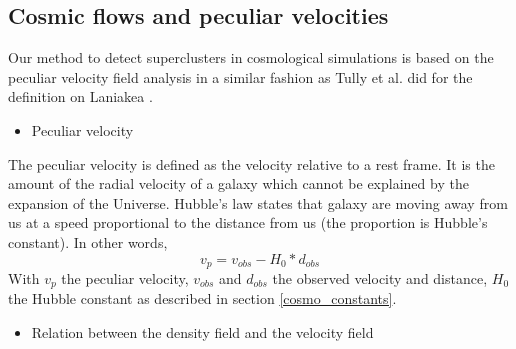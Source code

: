 \documentclass[12pt]{article}
\begin{document}
\subsection{Cosmic flows and peculiar velocities}
\label{sec:peculiar_vel}
Our method to detect superclusters in cosmological
 simulations is based on the peculiar velocity field
  analysis in a similar fashion as Tully et al. did for
   the definition on Laniakea \cite{tully_laniakea_2014}
    \cite{tempel_cosmology:_2014}.
\begin{itemize}
\item Peculiar velocity
\end{itemize}
\begin{par}
The peculiar velocity is defined as the velocity relative to a rest frame. It is the amount of the radial velocity of a galaxy which cannot be explained by the expansion of the Universe. Hubble's law states that galaxy are moving away from us at a speed proportional to the distance from us (the proportion is Hubble's constant). In other words,
\[ 
v_p = v_{obs} - H_{0} * d_{obs}
\]
With $v_p$ the peculiar velocity, $v_{obs}$ and $d_{obs}$ the observed velocity and distance, $H_{0}$ the Hubble constant as described in section \ref{cosmo_constants}.
\end{par}

\begin{itemize}
\item Relation between the density field and the velocity field
\end{itemize}
\end{document}
